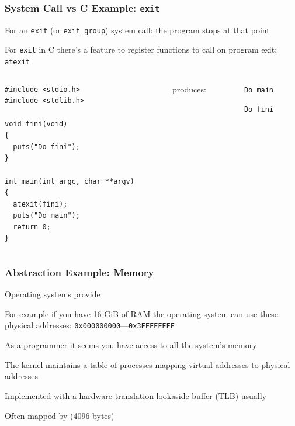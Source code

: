 \documentclass[aspectratio=169]{beamer}
\begin{document}
  \begin{frame}[fragile]
    \frametitle{System Call vs C Example: \texttt{exit}}

    For an \texttt{exit} (or \texttt{exit\_group}) system call: the program
    stops at that point

    \vspace{1em}

    For \texttt{exit} in C there's a feature to register functions to call
    on program exit: \texttt{atexit}

    \vspace{1em}

    \begin{columns}
      \begin{column}{0.4\textwidth}
        \begin{lstlisting}[basicstyle=\ttfamily\footnotesize]
#include <stdio.h>
#include <stdlib.h>

void fini(void)
{
  puts("Do fini");
}

int main(int argc, char **argv)
{
  atexit(fini);
  puts("Do main");
  return 0;
}
        \end{lstlisting}
      \end{column}
      \begin{column}{0.13\textwidth}
        produces:
      \end{column}
      \begin{column}{0.13\textwidth}
        \texttt{Do main}

        \texttt{Do fini}
      \end{column}
    \end{columns}
  \end{frame}

  \begin{frame}
    \frametitle{Abstraction Example: Memory}

    Operating systems provide 

    \vspace{1em}

    For example if you have 16 GiB of RAM the operating system can use these
    physical addresses: \texttt{0x000000000}---\texttt{0x3FFFFFFFF}

    \vspace{1em}

    As a programmer it seems you have access to all the system's memory

    \vspace{1em}

    The kernel maintains a table of processes mapping virtual addresses to
    physical addresses

    \hspace{1em} Implemented with a hardware translation lookaside buffer (TLB)
                 usually

    \hspace{1em} Often mapped by  (4096 bytes)
  \end{frame}
\end{document}
